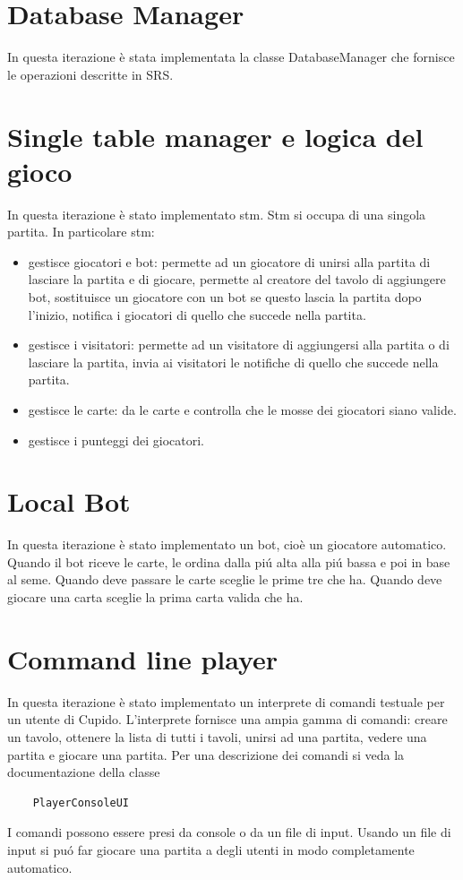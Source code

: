 \section{Database Manager}
  In questa iterazione \`e stata implementata la classe DatabaseManager che fornisce le operazioni descritte in SRS.


\section{Single table manager e logica del gioco}
  In questa iterazione \`e stato implementato stm. Stm si occupa di una singola partita. In particolare stm:
  \begin{itemize}
    \item 
      gestisce giocatori e bot: permette ad un giocatore di unirsi alla partita  di lasciare la partita e di giocare, permette al creatore del tavolo di aggiungere bot, sostituisce un giocatore con un bot se questo lascia la partita dopo l'inizio, notifica i giocatori di quello che succede nella partita.
    \item
      gestisce i visitatori: permette ad un visitatore di aggiungersi alla partita o di lasciare la partita, invia ai visitatori le notifiche di quello che succede nella partita.
    \item
      gestisce le carte: da le carte e controlla che le mosse dei giocatori siano valide.
    \item
      gestisce i punteggi dei giocatori.
  \end{itemize}
  

\section{Local Bot}
  In questa iterazione \`e stato implementato un bot, cio\`e un giocatore automatico. Quando il bot riceve le carte, le ordina dalla pi\'u alta alla pi\'u bassa e poi in base al seme. Quando deve passare le carte sceglie le prime tre che ha. Quando deve giocare una carta sceglie la prima carta valida che ha.

\section{Command line player}
  In questa iterazione \`e stato implementato un interprete di comandi testuale per un utente di Cupido. L'interprete fornisce una ampia gamma di comandi: creare un tavolo, ottenere la lista di tutti i tavoli, unirsi ad una partita, vedere una partita e giocare una partita. Per una descrizione dei comandi si veda la documentazione della classe
  \begin{verbatim}
    PlayerConsoleUI
  \end{verbatim}
  I comandi possono essere presi da console o da un file di input. Usando un file di input si pu\'o far giocare una partita a degli utenti in modo completamente automatico.

